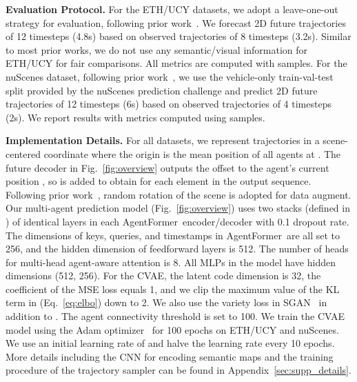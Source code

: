 \documentclass[10pt,twocolumn,letterpaper]{article}
\newcommand{\mname}{AgentFormer}
\begin{document}
\vspace{2mm}
\noindent\textbf{Evaluation Protocol.}
For the ETH/UCY datasets, we adopt a leave-one-out strategy for evaluation, following prior work~\cite{gupta2018social,sadeghian2019sophie,salzmann2020trajectron++,mangalam2020not,yu2020spatio}. We forecast 2D future trajectories of 12 timesteps (4.8s) based on observed trajectories of 8 timesteps (3.2s). Similar to most prior works, we do not use any semantic/visual information for ETH/UCY for fair comparisons. All metrics are computed with  samples. For the nuScenes dataset, following prior work~\cite{phan2020covernet,chai2020multipath,cui2019multimodal,ma2020diverse}, we use the vehicle-only train-val-test split provided by the nuScenes prediction challenge and predict 2D future trajectories of 12 timesteps (6s) based on observed trajectories of 4 timesteps (2s). We report results with metrics computed using  samples.

\vspace{2mm}
\noindent\textbf{Implementation Details.}
For all datasets, we represent trajectories in a scene-centered coordinate where the origin is the mean position of all agents at . The future decoder in Fig.~\ref{fig:overview} outputs the offset to the agent's current position , so  is added to obtain  for each element in the output sequence. Following prior work~\cite{salzmann2020trajectron++,yu2020spatio}, random rotation of the scene is adopted for data augment.
Our multi-agent prediction model (Fig.~\ref{fig:overview}) uses two stacks (defined in \cite{vaswani2017attention}) of identical layers in each \mname\ encoder/decoder with 0.1 dropout rate. The dimensions  of keys, queries, and timestamps in \mname\ are all set to 256, and the hidden dimension of feedforward layers is 512. The number of heads for multi-head agent-aware attention is 8. All MLPs in the model have hidden dimensions (512, 256). For the CVAE, the latent code dimension  is 32, the coefficient  of the MSE loss equals 1, and we clip the maximum value of the KL term in  (Eq.~\eqref{eq:elbo}) down to 2. We also use the variety loss in SGAN~\cite{gupta2018social} in addition to . The agent connectivity threshold  is set to 100. We train the CVAE model using the Adam optimizer~\cite{kingma2014adam} for 100 epochs on ETH/UCY and nuScenes. We use an initial learning rate of  and halve the learning rate every 10 epochs. More details including the CNN for encoding semantic maps and the training procedure of the trajectory sampler can be found in Appendix~\ref{sec:supp_details}.
\end{document}

